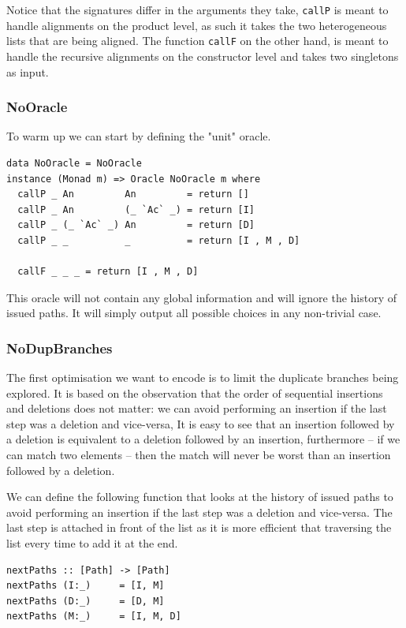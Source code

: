 \documentclass[11pt, titlepage]{article}
\newcommand{\toHaskell}[1]{\texttt{#1}\xspace}
\begin{document}
Notice that the signatures differ in the arguments they take, \toHaskell{callP} is meant to handle alignments on the product level, as such it takes the two heterogeneous lists that are being aligned. The function \toHaskell{callF} on the other hand, is meant to handle the recursive alignments on the constructor level and takes two singletons as input.
 
\subsubsection{NoOracle}
To warm up we can start by defining the "unit" oracle. 

\begin{verbatim}
data NoOracle = NoOracle
instance (Monad m) => Oracle NoOracle m where
  callP _ An         An         = return []
  callP _ An         (_ `Ac` _) = return [I]
  callP _ (_ `Ac` _) An         = return [D]
  callP _ _          _          = return [I , M , D]

  callF _ _ _ = return [I , M , D]
\end{verbatim}

This oracle will not contain any global information and will ignore the history of issued paths. It will simply output all possible choices in any non-trivial case.

\subsubsection{NoDupBranches}

The first optimisation we want to encode is to limit the duplicate branches being explored. It is based on the observation that the order of sequential insertions and deletions does not matter: we can avoid performing an insertion if the last step was a deletion and vice-versa,
It is easy to see that an insertion followed by a deletion is equivalent to a deletion followed by an insertion, furthermore -- if we can match two elements -- then the match will never be worst than an insertion followed by a deletion. 

We can define the following function that looks at the history of issued paths to avoid performing an insertion if the last step was a deletion and vice-versa. The last step is attached in front of the list as it is more efficient that traversing the list every time to add it at the end.

\begin{verbatim}
nextPaths :: [Path] -> [Path]
nextPaths (I:_)     = [I, M]
nextPaths (D:_)     = [D, M]
nextPaths (M:_)     = [I, M, D]
\end{verbatim}
\end{document}
